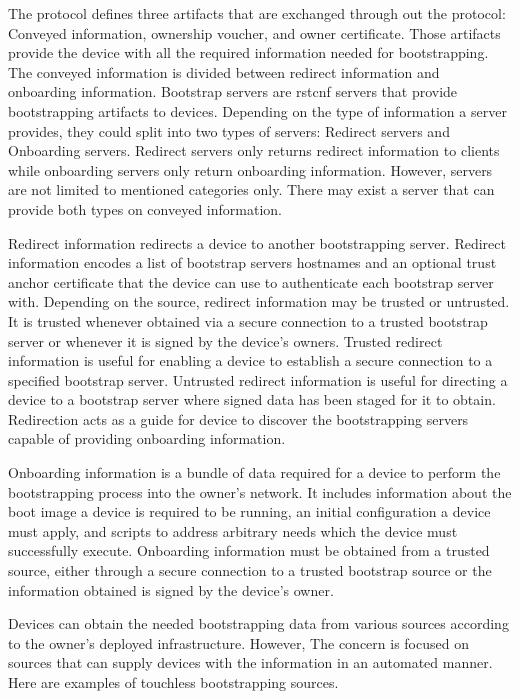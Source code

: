 \par
The protocol defines three artifacts that are exchanged through out the protocol: Conveyed information, ownership voucher, and owner certificate. Those artifacts provide the device with all the required information needed for bootstrapping. The conveyed information is divided between redirect information and onboarding information.
Bootstrap servers are \gls{rstcnf} servers that provide bootstrapping artifacts to devices. Depending on the type of information a server provides, they could split into two types of servers: Redirect servers and Onboarding servers. Redirect servers only returns redirect information to clients while onboarding servers only return onboarding information. However, servers are not limited to mentioned categories only. There may exist a server that can provide both types on conveyed information.
\par
Redirect information redirects a device to another bootstrapping server. 
Redirect information encodes a list of bootstrap servers hostnames and an optional trust anchor certificate that the device can use to authenticate each bootstrap server with. Depending on the source, redirect information may be trusted or untrusted. It is trusted whenever obtained via a secure connection to a trusted bootstrap server or whenever it is signed by the device’s owners. Trusted redirect information is useful for enabling a device to establish a secure connection to a specified bootstrap server. Untrusted redirect information is useful for directing a device to a bootstrap server where signed data has been staged for it to obtain. Redirection acts as a guide for device to discover the bootstrapping servers capable of providing onboarding information.
\par
Onboarding information is a bundle of data required for a device to perform the bootstrapping process into the owner’s network. It includes information about the boot image a device is required to be running, an initial configuration a device must apply, and scripts to address arbitrary needs which the device must successfully execute. Onboarding information must be obtained from a trusted source, either through a secure connection to a trusted bootstrap source or the information obtained is signed by the device’s owner.
\par
Devices can obtain the needed bootstrapping data from various sources according to the owner's deployed infrastructure. However, The concern is focused on sources that can supply devices with the information in an automated manner. Here are examples of touchless bootstrapping sources.
